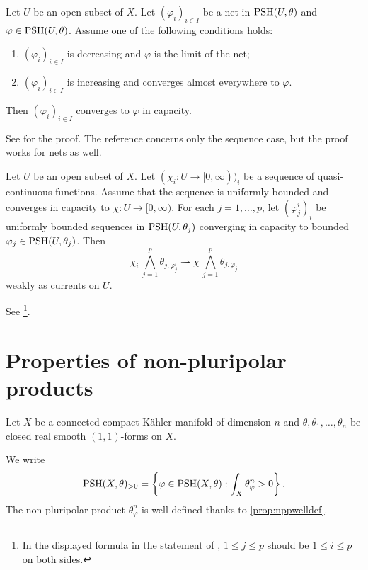 \begin{proposition}\label{prop:mono_psh_cap}
Let $U$ be an open subset of $X$.
    Let $(\varphi_i)_{i\in I}$ be a net in $\mathrm{PSH}(U,\theta)$ and $\varphi\in \mathrm{PSH}(U,\theta)$. Assume one of the following conditions holds:
    \begin{enumerate}
        \item\label{itm:prop:mono_psh_cap:1} $(\varphi_i)_{i\in I}$ is decreasing and $\varphi$ is the limit of the net;
        \item\label{itm:prop:mono_psh_cap:2} $(\varphi_i)_{i\in I}$ is increasing and converges almost everywhere to $\varphi$.
    \end{enumerate}
    Then $(\varphi_i)_{i\in I}$ converges to $\varphi$ in capacity.
\end{proposition}
See \cite[Proposition~4.25]{GZ17} for the proof. The reference concerns only the sequence case, but the proof works for nets as well.


\begin{theorem}\label{thm:loc_conv_cap}
    Let $U$ be an open subset of $X$. Let $(\chi_i\colon U\rightarrow [0,\infty))_i$ be a sequence of quasi-continuous functions. Assume that the sequence is uniformly bounded and converges in capacity to $\chi\colon U\rightarrow [0,\infty)$. For each $j=1,\ldots,p$, let $(\varphi_j^i)_i$ be uniformly bounded sequences in $\mathrm{PSH}(U,\theta_j)$ converging in capacity to bounded $\varphi_j\in \mathrm{PSH}(U,\theta_j)$. Then
    \[
        \chi_i\,\bigwedge_{j=1}^p \theta_{j,\varphi_j^i}\rightharpoonup  \chi\,\bigwedge_{j=1}^p \theta_{j,\varphi_j}
    \]
    weakly as currents on $U$.
\end{theorem}
See \cite[Theorem~4.26]{GZ17}\footnote{In the displayed formula in the statement of \cite[Theorem~4.26]{GZ17}, $1\leq j\leq p$ should be $1\leq i\leq p$ on both sides.}.

\section{Properties of non-pluripolar products}\label{sec:nppprop}
Let $X$ be a connected compact Kähler manifold of dimension $n$ and $\theta,\theta_1,\ldots,\theta_n$ be closed real smooth $(1,1)$-forms on $X$.

We write
\begin{equation}\label{eq:PSHpos}
\mathrm{PSH}(X,\theta)_{>0}=\left\{ \varphi\in \mathrm{PSH}(X,\theta): \int_X\theta_{\varphi}^n>0 \right\}.
\end{equation}
The non-pluripolar product $\theta_{\varphi}^n$ is well-defined thanks to \cref{prop:nppwelldef}.

